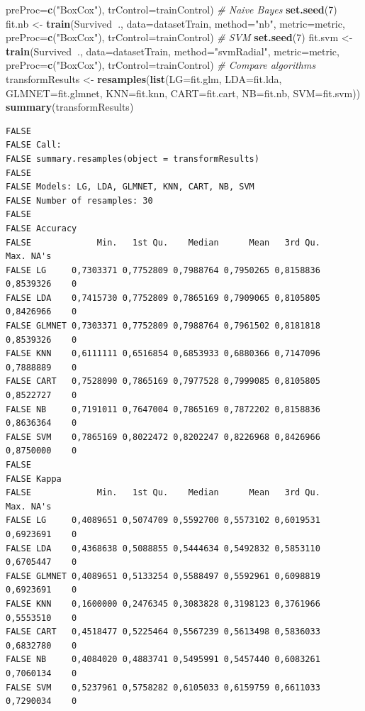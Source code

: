 \documentclass[]{article}
\newenvironment{Shaded}{\begin{snugshade}}{\end{snugshade}}
\newcommand{\KeywordTok}[1]{\textcolor[rgb]{0.13,0.29,0.53}{\textbf{#1}}}
\newcommand{\DataTypeTok}[1]{\textcolor[rgb]{0.13,0.29,0.53}{#1}}
\newcommand{\DecValTok}[1]{\textcolor[rgb]{0.00,0.00,0.81}{#1}}
\newcommand{\StringTok}[1]{\textcolor[rgb]{0.31,0.60,0.02}{#1}}
\newcommand{\CommentTok}[1]{\textcolor[rgb]{0.56,0.35,0.01}{\textit{#1}}}
\newcommand{\OperatorTok}[1]{\textcolor[rgb]{0.81,0.36,0.00}{\textbf{#1}}}
\newcommand{\NormalTok}[1]{#1}
\begin{document}
\begin{Shaded}
\begin{Highlighting}[]
    \DataTypeTok{preProc=}\KeywordTok{c}\NormalTok{(}\StringTok{"BoxCox"}\NormalTok{), }\DataTypeTok{trControl=}\NormalTok{trainControl)}
\CommentTok{# Naive Bayes}
\KeywordTok{set.seed}\NormalTok{(}\DecValTok{7}\NormalTok{)}
\NormalTok{fit.nb <-}\StringTok{ }\KeywordTok{train}\NormalTok{(Survived}\OperatorTok{~}\NormalTok{., }\DataTypeTok{data=}\NormalTok{datasetTrain, }\DataTypeTok{method=}\StringTok{"nb"}\NormalTok{, }\DataTypeTok{metric=}\NormalTok{metric, }\DataTypeTok{preProc=}\KeywordTok{c}\NormalTok{(}\StringTok{"BoxCox"}\NormalTok{),}
    \DataTypeTok{trControl=}\NormalTok{trainControl)}
\CommentTok{# SVM}
\KeywordTok{set.seed}\NormalTok{(}\DecValTok{7}\NormalTok{)}
\NormalTok{fit.svm <-}\StringTok{ }\KeywordTok{train}\NormalTok{(Survived}\OperatorTok{~}\NormalTok{., }\DataTypeTok{data=}\NormalTok{datasetTrain, }\DataTypeTok{method=}\StringTok{"svmRadial"}\NormalTok{, }\DataTypeTok{metric=}\NormalTok{metric,}
    \DataTypeTok{preProc=}\KeywordTok{c}\NormalTok{(}\StringTok{"BoxCox"}\NormalTok{), }\DataTypeTok{trControl=}\NormalTok{trainControl)}
\CommentTok{# Compare algorithms}
\NormalTok{transformResults <-}\StringTok{ }\KeywordTok{resamples}\NormalTok{(}\KeywordTok{list}\NormalTok{(}\DataTypeTok{LG=}\NormalTok{fit.glm, }\DataTypeTok{LDA=}\NormalTok{fit.lda, }\DataTypeTok{GLMNET=}\NormalTok{fit.glmnet, }\DataTypeTok{KNN=}\NormalTok{fit.knn,}
    \DataTypeTok{CART=}\NormalTok{fit.cart, }\DataTypeTok{NB=}\NormalTok{fit.nb, }\DataTypeTok{SVM=}\NormalTok{fit.svm))}
\KeywordTok{summary}\NormalTok{(transformResults)}
\end{Highlighting}
\end{Shaded}

\begin{verbatim}
FALSE 
FALSE Call:
FALSE summary.resamples(object = transformResults)
FALSE 
FALSE Models: LG, LDA, GLMNET, KNN, CART, NB, SVM 
FALSE Number of resamples: 30 
FALSE 
FALSE Accuracy 
FALSE             Min.   1st Qu.    Median      Mean   3rd Qu.      Max. NA's
FALSE LG     0,7303371 0,7752809 0,7988764 0,7950265 0,8158836 0,8539326    0
FALSE LDA    0,7415730 0,7752809 0,7865169 0,7909065 0,8105805 0,8426966    0
FALSE GLMNET 0,7303371 0,7752809 0,7988764 0,7961502 0,8181818 0,8539326    0
FALSE KNN    0,6111111 0,6516854 0,6853933 0,6880366 0,7147096 0,7888889    0
FALSE CART   0,7528090 0,7865169 0,7977528 0,7999085 0,8105805 0,8522727    0
FALSE NB     0,7191011 0,7647004 0,7865169 0,7872202 0,8158836 0,8636364    0
FALSE SVM    0,7865169 0,8022472 0,8202247 0,8226968 0,8426966 0,8750000    0
FALSE 
FALSE Kappa 
FALSE             Min.   1st Qu.    Median      Mean   3rd Qu.      Max. NA's
FALSE LG     0,4089651 0,5074709 0,5592700 0,5573102 0,6019531 0,6923691    0
FALSE LDA    0,4368638 0,5088855 0,5444634 0,5492832 0,5853110 0,6705447    0
FALSE GLMNET 0,4089651 0,5133254 0,5588497 0,5592961 0,6098819 0,6923691    0
FALSE KNN    0,1600000 0,2476345 0,3083828 0,3198123 0,3761966 0,5553510    0
FALSE CART   0,4518477 0,5225464 0,5567239 0,5613498 0,5836033 0,6832780    0
FALSE NB     0,4084020 0,4883741 0,5495991 0,5457440 0,6083261 0,7060134    0
FALSE SVM    0,5237961 0,5758282 0,6105033 0,6159759 0,6611033 0,7290034    0
\end{verbatim}
\end{document}
